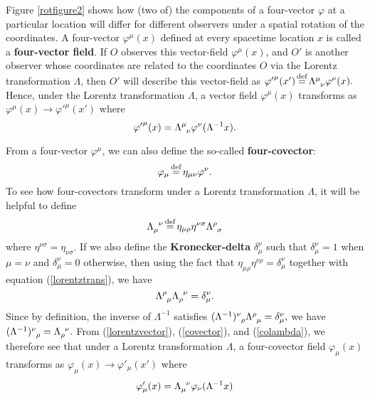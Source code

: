 Figure \ref{rotfigure2} shows how (two of) the components of a four-vector $\varphi$ at a particular location will differ for different observers under a spatial rotation of the coordinates. A four-vector $\varphi^\mu(x)$ defined at every spacetime location $x$ is called a \textbf{four-vector field}. If $O$ observes this vector-field $\varphi^\mu(x)$, and $O'$ is another observer whose coordinates are related to the coordinates $O$ via the Lorentz transformation $\Lambda$, then $O'$ will describe this vector-field as ${\varphi'}^\mu(x')\myeq\Lambda\indices{^\mu_\nu}\varphi^\nu(x).$ Hence, under the Lorentz transformation $\Lambda$,  a vector field $\varphi^\mu(x)$ transforms as ${\varphi}^\mu(x)\rightarrow {\varphi'}^\mu(x')$ where
\begin{equation}\label{lorentzvector}
{\varphi'}^\mu(x)=\Lambda\indices{^\mu_\nu}\varphi^\nu(\Lambda^{-1}x).
\end{equation} 



From a four-vector $\varphi^\mu$, we can also define the so-called \textbf{four-covector}: 
\begin{equation}\label{covector}
	\varphi_\mu\myeq\eta_{\mu\nu}\varphi^\nu.
\end{equation}
To see how four-covectors transform under a Lorentz transformation $\Lambda$, it will be helpful to define 
\begin{equation}\label{colambda}
	\Lambda\indices{_\mu^\nu}\myeq\eta_{\mu\rho}\eta^{\nu\sigma}\Lambda\indices{^\rho_\sigma}
\end{equation}
where $\eta^{\nu\sigma}=\eta_{\nu\sigma}$. If we also define the \textbf{Kronecker-delta} $\delta^\nu_\mu$ such that $\delta^\nu_\mu=1$ when $\mu=\nu$ and $\delta^\nu_\mu=0$ otherwise, then using the fact that $\eta_{\mu\rho}\eta^{\nu\rho}=\delta^\nu_\mu$ together with equation (\ref{lorentztrans}), we have 
\begin{equation}\label{lambdainverse}
\Lambda\indices{^\rho_\mu}\Lambda\indices{_\rho^\nu}=\delta^\nu_\mu.
\end{equation}
Since by definition, the inverse of $\Lambda^{-1}$ satisfies 
$(\Lambda^{-1})\indices{^\nu_\rho}\Lambda\indices{^\rho_\mu}=\delta^\nu_\mu,$
 we have $(\Lambda^{-1})\indices{^\nu_\rho}=\Lambda\indices{_\rho^\nu}.$  From (\ref{lorentzvector}), (\ref{covector}), and (\ref{colambda}), we therefore see that under a Lorentz transformation $\Lambda$, a four-covector field $\varphi_\mu(x)$ transforms as $\varphi_\mu(x)\rightarrow\varphi'_\mu(x')$
where
\begin{equation}\label{lorentzcovector}
\varphi'_\mu(x)=\Lambda\indices{_\mu^\nu}\varphi_\nu(\Lambda^{-1}x)
\end{equation}
 

